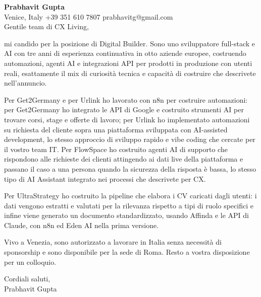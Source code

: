 \documentclass[a4paper,10.5pt]{article}
\begin{document}
\textbf{Prabhavit Gupta}\\
Venice, Italy \textbar{} +39 351 610 7807 \textbar{} prabhavitg@gmail.com\\[10pt]
Gentile team di CX Living,

mi candido per la posizione di Digital Builder. Sono uno sviluppatore full-stack e AI con tre anni di esperienza continuativa in otto aziende europee, costruendo automazioni, agenti AI e integrazioni API per prodotti in produzione con utenti reali, esattamente il mix di curiosità tecnica e capacità di costruire che descrivete nell'annuncio.

Per Get2Germany e per Urlink ho lavorato con n8n per costruire automazioni: per Get2Germany ho integrato le API di Google e costruito strumenti AI per trovare corsi, stage e offerte di lavoro; per Urlink ho implementato automazioni su richiesta del cliente sopra una piattaforma sviluppata con AI-assisted development, lo stesso approccio di sviluppo rapido e vibe coding che cercate per il vostro team IT. Per FlowSpace ho costruito agenti AI di supporto che rispondono alle richieste dei clienti attingendo ai dati live della piattaforma e passano il caso a una persona quando la sicurezza della risposta è bassa, lo stesso tipo di AI Assistant integrato nei processi che descrivete per CX.

Per UltraStrategy ho costruito la pipeline che elabora i CV caricati dagli utenti: i dati vengono estratti e valutati per la rilevanza rispetto a tipi di ruolo specifici e infine viene generato un documento standardizzato, usando Affinda e le API di Claude, con n8n ed Eden AI nella prima versione.

Vivo a Venezia, sono autorizzato a lavorare in Italia senza necessità di sponsorship e sono disponibile per la sede di Roma. Resto a vostra disposizione per un colloquio.

Cordiali saluti,\\
Prabhavit Gupta
\end{document}
